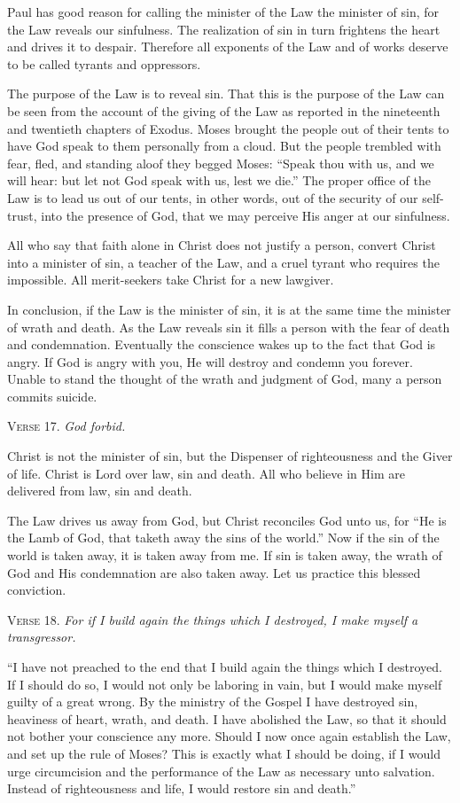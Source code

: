 Paul has good reason for calling the minister of the Law the minister of sin, for the Law reveals our sinfulness. The realization of sin in turn frightens the heart and drives it to despair. Therefore all exponents of the Law and of works deserve to be called tyrants and oppressors.

The purpose of the Law is to reveal sin. That this is the purpose of the Law can be seen from the account of the giving of the Law as reported in the nineteenth and twentieth chapters of Exodus. Moses brought the people out of their tents to have God speak to them personally from a cloud. But the people trembled with fear, fled, and standing aloof they begged Moses: “Speak thou with us, and we will hear: but let not God speak with us, lest we die.” The proper office of the Law is to lead us out of our tents, in other words, out of the security of our self-trust, into the presence of God, that we may perceive His anger at our sinfulness.

All who say that faith alone in Christ does not justify a person, convert Christ into a minister of sin, a teacher of the Law, and a cruel tyrant who requires the impossible. All merit-seekers take Christ for a new lawgiver.

In conclusion, if the Law is the minister of sin, it is at the same time the minister of wrath and death. As the Law reveals sin it fills a person with the fear of death and condemnation. Eventually the conscience wakes up to the fact that God is angry. If God is angry with you, He will destroy and condemn you forever. Unable to stand the thought of the wrath and judgment of God, many a person commits suicide.

\textsc{Verse} 17. \emph{God forbid.}

Christ is not the minister of sin, but the Dispenser of righteousness and the Giver of life. Christ is Lord over law, sin and death. All who believe in Him are delivered from law, sin and death.

The Law drives us away from God, but Christ reconciles God unto us, for “He is the Lamb of God, that taketh away the sins of the world.” Now if the sin of the world is taken away, it is taken away from me. If sin is taken away, the wrath of God and His condemnation are also taken away. Let us practice this blessed conviction.

\textsc{Verse} 18. \emph{For if I build again the things which I destroyed, I make myself a transgressor.}

“I have not preached to the end that I build again the things which I destroyed. If I should do so, I would not only be laboring in vain, but I would make myself guilty of a great wrong. By the ministry of the Gospel I have destroyed sin, heaviness of heart, wrath, and death. I have abolished the Law, so that it should not bother your conscience any more. Should I now once again establish the Law, and set up the rule of Moses? This is exactly what I should be doing, if I would urge circumcision and the performance of the Law as necessary unto salvation. Instead of righteousness and life, I would restore sin and death.”


